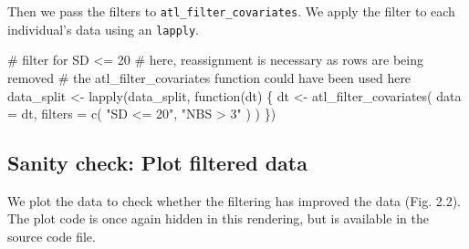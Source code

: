 \documentclass[]{scrreprt}
\newenvironment{Shaded}{}{}
\newcommand{\CommentTok}[1]{\textcolor[rgb]{0.00,0.50,0.00}{#1}}
\newcommand{\ControlFlowTok}[1]{\textcolor[rgb]{0.00,0.00,1.00}{#1}}
\newcommand{\DataTypeTok}[1]{#1}
\newcommand{\KeywordTok}[1]{\textcolor[rgb]{0.00,0.00,1.00}{#1}}
\newcommand{\NormalTok}[1]{#1}
\newcommand{\StringTok}[1]{\textcolor[rgb]{0.00,0.50,0.50}{#1}}
\begin{document}
Then we pass the filters to \texttt{atl\_filter\_covariates}.
We apply the filter to each individual's data using an \texttt{lapply}.

\begin{Shaded}
\begin{Highlighting}[]
\CommentTok{# filter for SD <= 20}
\CommentTok{# here, reassignment is necessary as rows are being removed}
\CommentTok{# the atl_filter_covariates function could have been used here}
\NormalTok{data_split <-}\StringTok{ }\KeywordTok{lapply}\NormalTok{(data_split, }\ControlFlowTok{function}\NormalTok{(dt) \{}
\NormalTok{  dt <-}\StringTok{ }\KeywordTok{atl_filter_covariates}\NormalTok{(}
    \DataTypeTok{data =}\NormalTok{ dt,}
    \DataTypeTok{filters =} \KeywordTok{c}\NormalTok{(}
      \StringTok{"SD <= 20"}\NormalTok{,}
      \StringTok{"NBS > 3"}
\NormalTok{    )}
\NormalTok{  )}
\NormalTok{\})}
\end{Highlighting}
\end{Shaded}

\hypertarget{sanity-check-plot-filtered-data}{%
\subsection{Sanity check: Plot filtered data}\label{sanity-check-plot-filtered-data}}

We plot the data to check whether the filtering has improved the data (Fig. 2.2).
The plot code is once again hidden in this rendering, but is available in the source code file.
\end{document}
